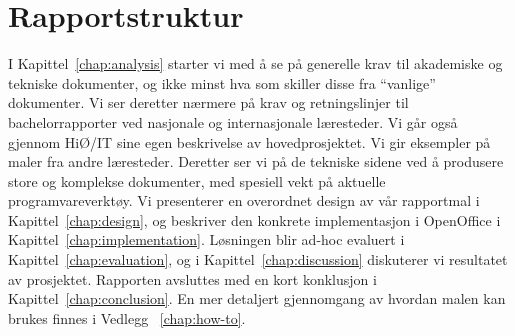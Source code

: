 \section{Rapportstruktur}


I Kapittel~\ref{chap:analysis} starter vi med å se på generelle krav til akademiske og tekniske dokumenter, og ikke minst hva som skiller disse fra ``vanlige'' dokumenter. Vi ser deretter nærmere på krav og retningslinjer til bachelorrapporter ved nasjonale og internasjonale læresteder. Vi går også gjennom HiØ/IT sine egen beskrivelse av hovedprosjektet.  Vi gir eksempler på maler fra andre læresteder. Deretter ser vi på de tekniske sidene ved å produsere store og komplekse dokumenter, med spesiell vekt på aktuelle programvareverktøy. Vi presenterer en overordnet design av vår rapportmal i Kapittel~\ref{chap:design}, og beskriver den konkrete implementasjon i OpenOffice i Kapittel~\ref{chap:implementation}. Løsningen blir ad-hoc evaluert i Kapittel~\ref{chap:evaluation}, og i Kapittel~\ref{chap:discussion} diskuterer vi resultatet av prosjektet. Rapporten avsluttes med en kort konklusjon i Kapittel~\ref{chap:conclusion}. En mer detaljert gjennomgang av hvordan malen kan brukes finnes i Vedlegg~ \ref{chap:how-to}.


